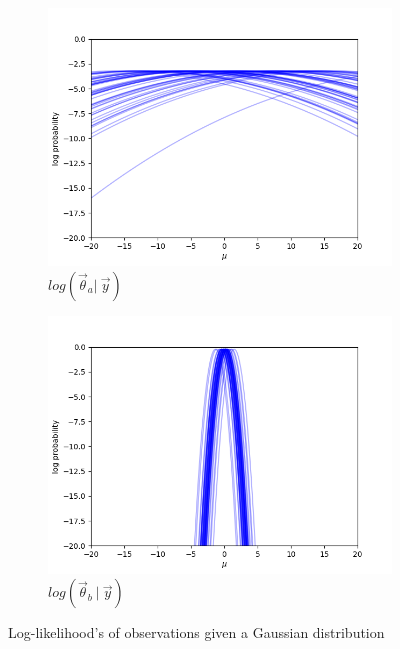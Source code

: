 \begin{figure}[H]
    \centering
    \begin{subfigure}{0.475\textwidth}
        \includegraphics[width=\textwidth]{figs/background/logprob_var_10.png}
        \caption[]{$log(\vec{\theta}_a |\ \vec{y})$}
    \end{subfigure}
    \begin{subfigure}{0.475\textwidth}
        \includegraphics[width=\textwidth]{figs/background/logprob_var_0.5.png}
        \caption[]{$log(\vec{\theta}_b\ |\ \vec{y})$}
    \end{subfigure}
    \caption{Log-likelihood's of observations given a Gaussian distribution}
    \label{fig:loglikelihoods}
\end{figure}
